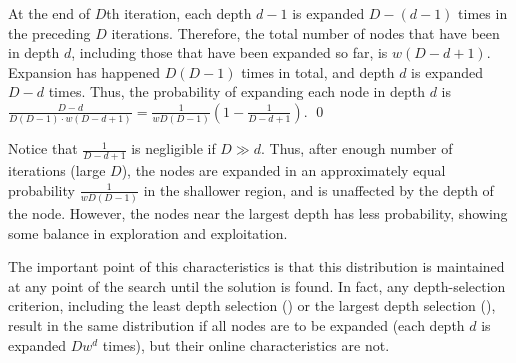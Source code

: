 At the end of $D$th iteration,
each depth $d-1$ is expanded $D-(d-1)$ times in the preceding $D$ iterations.
Therefore, the total number of nodes that have been in depth $d$, including those
that have been expanded so far, is $w(D-d+1)$.
Expansion has happened $D(D-1)$ times in total, and depth $d$ is expanded $D-d$ times.
Thus, the probability of expanding each node in depth $d$ is
$\frac{D-d}{D(D-1)\cdot w(D-d+1)}=\frac{1}{wD(D-1)}(1-\frac{1}{D-d+1})$.  \qed

Notice that $\frac{1}{D-d+1}$ is negligible if $D \gg d$.
Thus, after enough number of iterations (large $D$), the nodes are 
expanded in an approximately equal probability $\frac{1}{wD(D-1)}$ in the shallower region, and is
unaffected by the depth of the node.
However, the nodes near the largest depth has less probability, showing
some balance in exploration and exploitation.

The important point of this characteristics is that this
distribution is maintained at any point of the search until the solution
is found. In fact, any depth-selection criterion, including the least
depth selection (\fifo) or the largest depth selection (\lifo), 
result in the same distribution if all nodes are to be expanded (each
depth $d$ is expanded $Dw^d$ times), but their
online characteristics are not.
